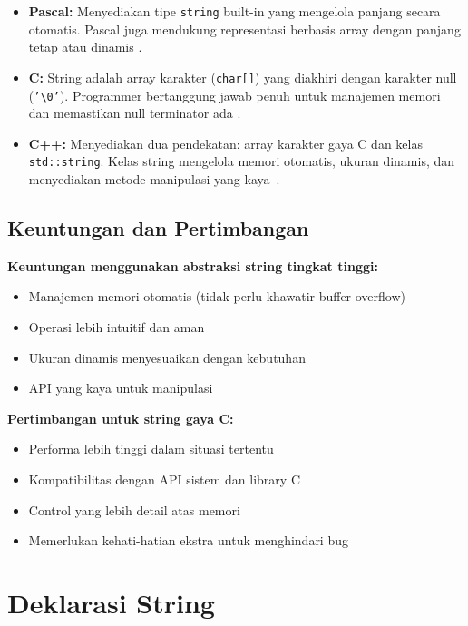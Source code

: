 \documentclass[../main.tex]{subfiles}
\begin{document}
\begin{itemize}
  \item \textbf{Pascal:} Menyediakan tipe \texttt{string} built-in yang mengelola panjang secara otomatis. Pascal juga mendukung representasi berbasis array dengan panjang tetap atau dinamis \parencite{pascal-tutorial-wikibooks,free-pascal-docs}.
  
  \item \textbf{C:} String adalah array karakter (\texttt{char[]}) yang diakhiri dengan karakter null (\texttt{'\textbackslash 0'}). Programmer bertanggung jawab penuh untuk manajemen memori dan memastikan null terminator ada \parencite{iso-c-draft-n1570,c-strings-h,tutorialspoint-c-strings}.
  
  \item \textbf{C++:} Menyediakan dua pendekatan: array karakter gaya C dan kelas \texttt{std::\allowbreak string}. Kelas string mengelola memori otomatis, ukuran dinamis, dan menyediakan metode manipulasi yang kaya~\parencite{cpp-strings,cplusplus-string,yuliaagustin-string-cpp}.
\end{itemize}

\subsection{Keuntungan dan Pertimbangan}

\textbf{Keuntungan menggunakan abstraksi string tingkat tinggi:}
\begin{itemize}
  \item Manajemen memori otomatis (tidak perlu khawatir buffer overflow)
  \item Operasi lebih intuitif dan aman
  \item Ukuran dinamis menyesuaikan dengan kebutuhan
  \item API yang kaya untuk manipulasi
\end{itemize}

\textbf{Pertimbangan untuk string gaya C:}
\begin{itemize}
  \item Performa lebih tinggi dalam situasi tertentu
  \item Kompatibilitas dengan API sistem dan library C
  \item Control yang lebih detail atas memori
  \item Memerlukan kehati-hatian ekstra untuk menghindari bug
\end{itemize}

\section{Deklarasi String}
\end{document}
